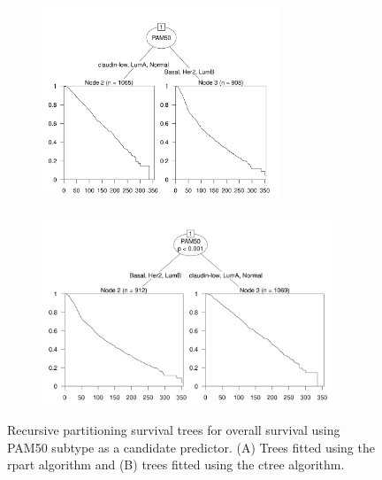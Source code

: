 \begin{figure}[!htbp]
\centering

\begin{minipage}{.44\textwidth}
\begin{subfigure}{\textwidth}
\subcaption{}
\includegraphics[width=\linewidth, height = 5.7cm]{../figures/Appendices/Appendix_B/Ind_Partykit_Survival_Score_OS_PAM50.png}
\end{subfigure}\par
\end{minipage}
\begin{minipage}{.55\textwidth}
\begin{subfigure}{\textwidth}
\subcaption{}
\includegraphics[width=\linewidth, height = 5.7cm]{../figures/Appendices/Appendix_B/Ind_Ctree_Survival_Score_OS_PAM50.png}
\end{subfigure}\par
\end{minipage}

\caption[Recursive partitioning survival trees for overall survival using PAM50 subtype as a candidate predictor.]{Recursive partitioning survival trees for overall survival using PAM50 subtype as a candidate predictor. (A) Trees fitted using the rpart algorithm and (B) trees fitted using the ctree algorithm.}
\end{figure}

